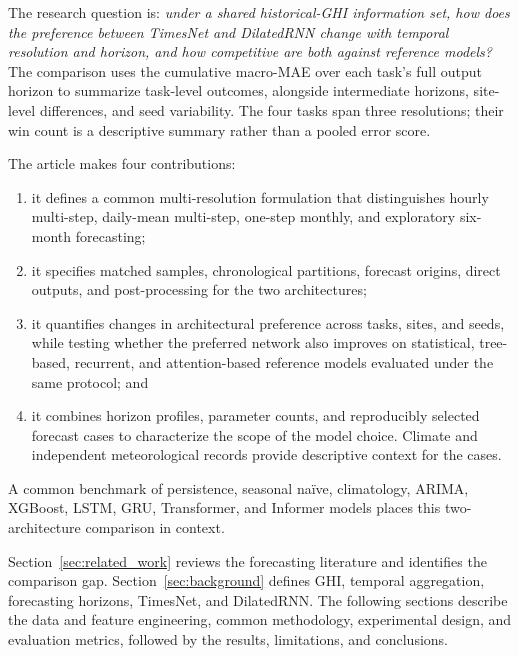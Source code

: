 The research question is: \emph{under a shared historical-GHI information
set, how does the preference between TimesNet and DilatedRNN change with
temporal resolution and horizon, and how competitive are both against
reference models?} The comparison uses the
cumulative macro-MAE over each task's full output horizon to summarize
task-level outcomes, alongside intermediate horizons, site-level
differences, and seed variability. The four tasks span three resolutions;
their win count is a descriptive summary rather than a pooled error score.

The article makes four contributions:
\begin{enumerate}
  \item it defines a common multi-resolution formulation that distinguishes
  hourly multi-step, daily-mean multi-step, one-step monthly, and exploratory
  six-month forecasting;
  \item it specifies matched samples, chronological partitions, forecast
  origins, direct outputs, and post-processing for the two architectures;
  \item it quantifies changes in architectural preference across tasks,
  sites, and seeds, while testing whether the preferred network also
  improves on statistical, tree-based, recurrent, and attention-based
  reference models evaluated under the same protocol; and
  \item it combines horizon profiles, parameter counts, and reproducibly
  selected forecast cases to characterize the scope of the model choice.
  Climate and independent meteorological records provide descriptive
  context for the cases.
\end{enumerate}
A common benchmark of persistence, seasonal na\"ive, climatology, ARIMA,
XGBoost, LSTM, GRU, Transformer, and Informer models places this
two-architecture comparison in context.

Section~\ref{sec:related_work} reviews the forecasting literature and
identifies the comparison gap. Section~\ref{sec:background} defines GHI,
temporal aggregation, forecasting horizons, TimesNet, and DilatedRNN.
The following sections describe the data and feature engineering, common
methodology, experimental design, and evaluation metrics, followed by the
results, limitations, and conclusions.
